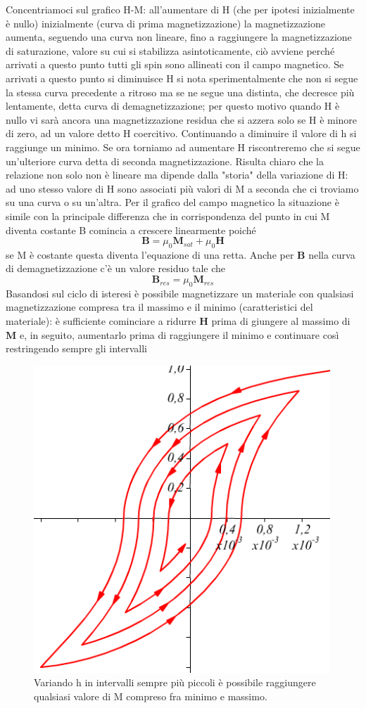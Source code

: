 \documentclass[
10pt, %
a4paper, %
oneside, %
headinclude,footinclude, %
BCOR5mm, %
]{scrartcl}
\begin{document}
\FloatBarrier
Concentriamoci sul grafico H-M: all'aumentare di H (che per ipotesi inizialmente è nullo) inizialmente (curva di prima magnetizzazione) la magnetizzazione aumenta, seguendo una curva non lineare, fino a raggiungere la magnetizzazione di saturazione, valore su cui si stabilizza asintoticamente, ciò avviene perché arrivati a questo punto tutti gli spin sono allineati con il campo magnetico. Se arrivati a questo punto si diminuisce H si nota sperimentalmente che non si segue la stessa curva precedente a ritroso ma se ne segue una distinta, che decresce più lentamente, detta curva di demagnetizzazione; per questo motivo quando H è nullo vi sarà ancora una magnetizzazione residua che si azzera solo se H è minore di zero, ad un valore detto H coercitivo. Continuando a diminuire il valore di h si raggiunge un minimo. Se ora torniamo ad aumentare H riscontreremo che si segue un'ulteriore curva detta di seconda magnetizzazione. Risulta chiaro che la relazione non solo non è lineare ma dipende dalla "storia" della variazione di H: ad uno stesso valore di H sono associati più valori di M a seconda che ci troviamo su una curva o su un'altra. Per il grafico del campo magnetico la situazione è simile con la principale differenza che in corrispondenza del punto in cui M diventa costante B comincia a crescere linearmente poiché
\[\mathbf{B} = \mu_0\mathbf{M}_{sat}+\mu_0\mathbf{H}\]
se M è costante questa diventa l'equazione di una retta. Anche per \(\mathbf{B}\) nella curva di demagnetizzazione c'è un valore residuo tale che
\[\mathbf{B}_{res} = \mu_0\mathbf{M}_{res}\] 
Basandosi sul ciclo di isteresi è possibile magnetizzare un materiale con qualsiasi magnetizzazione compresa tra il massimo e il minimo (caratteristici del materiale): è sufficiente cominciare a ridurre \(\mathbf{H}\) prima di giungere al massimo di \(\mathbf{M}\) e, in seguito, aumentarlo prima di raggiungere il minimo e continuare così restringendo sempre gli intervalli
\begin{figure}[h!]
	\centering
	\includegraphics[width=0.4\linewidth]{../images/loop_isteresi}
	\caption{Variando h in intervalli sempre più piccoli è possibile raggiungere qualsiasi valore di M compreso fra minimo e massimo.}
	\label{fig:loopisteresi}
\end{figure}
\end{document}
